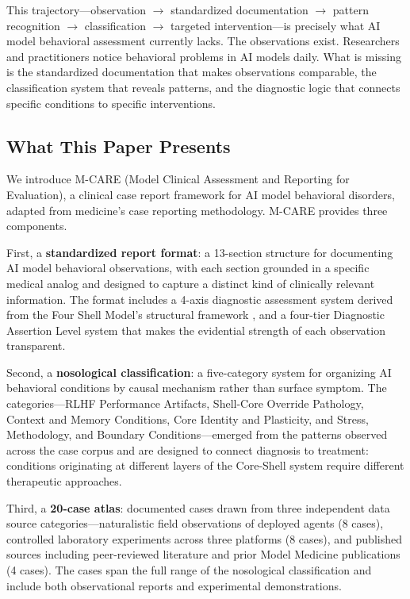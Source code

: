 \documentclass[11pt]{article}
\begin{document}
This trajectory---observation $\rightarrow$ standardized documentation $\rightarrow$ pattern recognition $\rightarrow$ classification $\rightarrow$ targeted intervention---is precisely what AI model behavioral assessment currently lacks. The observations exist. Researchers and practitioners notice behavioral problems in AI models daily. What is missing is the standardized documentation that makes observations comparable, the classification system that reveals patterns, and the diagnostic logic that connects specific conditions to specific interventions.

\subsection{What This Paper Presents}

We introduce M-CARE (Model Clinical Assessment and Reporting for Evaluation), a clinical case report framework for AI model behavioral disorders, adapted from medicine's case reporting methodology. M-CARE provides three components.

First, a \textbf{standardized report format}: a 13-section structure for documenting AI model behavioral observations, with each section grounded in a specific medical analog and designed to capture a distinct kind of clinically relevant information. The format includes a 4-axis diagnostic assessment system derived from the Four Shell Model's structural framework \citep{Jeong2026}, and a four-tier Diagnostic Assertion Level system that makes the evidential strength of each observation transparent.

Second, a \textbf{nosological classification}: a five-category system for organizing AI behavioral conditions by causal mechanism rather than surface symptom. The categories---RLHF Performance Artifacts, Shell-Core Override Pathology, Context and Memory Conditions, Core Identity and Plasticity, and Stress, Methodology, and Boundary Conditions---emerged from the patterns observed across the case corpus and are designed to connect diagnosis to treatment: conditions originating at different layers of the Core-Shell system require different therapeutic approaches.

Third, a \textbf{20-case atlas}: documented cases drawn from three independent data source categories---naturalistic field observations of deployed agents (8 cases), controlled laboratory experiments across three platforms (8 cases), and published sources including peer-reviewed literature and prior Model Medicine publications (4 cases). The cases span the full range of the nosological classification and include both observational reports and experimental demonstrations.
\end{document}
